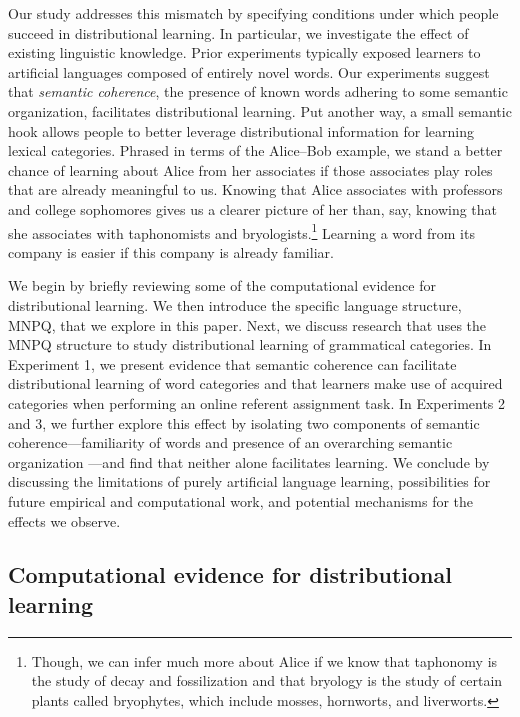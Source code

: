 \documentclass[man,floatsintext]{apa6}
\begin{document}
Our study addresses this mismatch by specifying conditions under which people succeed in distributional learning. In particular, we investigate the effect of existing linguistic knowledge. Prior experiments typically exposed learners to artificial languages composed of entirely novel words. Our experiments suggest that \emph{semantic coherence}, the presence of known words adhering to some semantic organization, facilitates distributional learning. Put another way, a small semantic hook allows people to better leverage distributional information for learning lexical categories. Phrased in terms of the Alice--Bob example, we stand a better chance of learning about Alice from her associates if those associates play roles that are already meaningful to us. Knowing that Alice associates with professors and college sophomores gives us a clearer picture of her than, say, knowing that she associates with taphonomists and bryologists.\footnote{Though, we can infer much more about Alice if we know that taphonomy is the study of decay and fossilization and that bryology is the study of certain plants called bryophytes, which include mosses, hornworts, and liverworts.} Learning a word from its company is easier if this company is already familiar. 

We begin by briefly reviewing some of the computational evidence for distributional learning. We then introduce the specific language structure, MNPQ, that we explore in this paper. Next, we discuss research that uses the MNPQ structure to study distributional learning of grammatical categories. In Experiment 1, we present evidence that semantic coherence can facilitate distributional learning of word categories and that learners make use of acquired categories when performing an online referent assignment task. In Experiments 2 and 3, we further explore this effect by isolating two components of semantic coherence---familiarity of words and presence of an overarching semantic organization ---and find that neither alone facilitates learning. We conclude by discussing the limitations of purely artificial language learning, possibilities for future empirical and computational work, and potential mechanisms for the effects we observe.
 
\subsection{Computational evidence for distributional learning}
\end{document}
